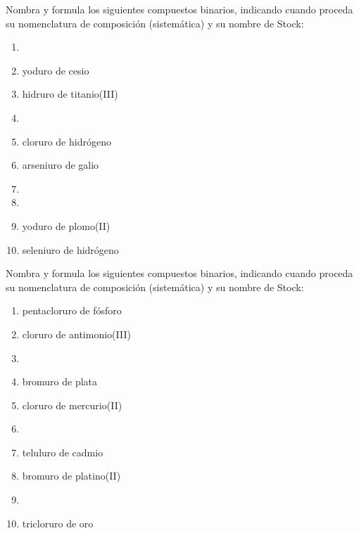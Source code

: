 \documentclass[10pt]{article}
\begin{document}
\begin{exercise}[
    tags    = {inorgánica,compuestos binarios,sales binarias,sales,hidruros},
    topics  = {química inorgánica,formulación,nomenclatura},
    source  = {SAN Formulación, p26, e28},
  ]
  Nombra y formula los siguientes compuestos binarios, indicando cuando proceda su nomenclatura de composición (sistemática) y su nombre de Stock:

  \begin{enumerate}
    \item {}
    \item yoduro de cesio
    \item hidruro de titanio(III)
    \item {}
    \item cloruro de hidrógeno
    \item arseniuro de galio
    \item {}
    \item {}
    \item yoduro de plomo(II)
    \item seleniuro de hidrógeno
  \end{enumerate}
\end{exercise}

\begin{exercise}[
    tags    = {inorgánica,compuestos binarios,sales binarias,sales},
    topics  = {química inorgánica,formulación,nomenclatura},
    source  = {SAN Formulación, p26, e29},
  ]

  Nombra y formula los siguientes compuestos binarios, indicando cuando proceda su nomenclatura de composición (sistemática) y su nombre de Stock:

  \begin{enumerate}
    \item pentacloruro de fósforo
    \item cloruro de antimonio(III)
    \item {}
    \item bromuro de plata
    \item cloruro de mercurio(II)
    \item {}
    \item teluluro de cadmio
    \item bromuro de platino(II)
    \item {}
    \item tricloruro de oro
  \end{enumerate}
\end{exercise}
\end{document}
